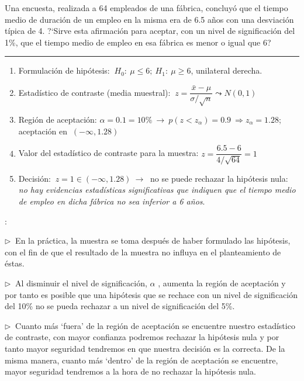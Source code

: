\vspace{4mm}
\begin{ejemplo}
\begin{ejre}

Una encuesta, realizada a 64 empleados de una fábrica, concluyó que el tiempo medio de duración de un empleo en la misma era de 6.5 años con una desviación típica de 4. ?`Sirve esta afirmación para aceptar, con un nivel de significación del 1\%, que el tiempo medio de empleo en esa fábrica es menor o igual que 6?	


	\rule{150pt}{0.1pt}
	
\begin{enumerate}[1.- ]
\item Formulación de hipótesis: $\ H_0:\ \mu\le 6;\ H_1:\ \mu\ge 6$, unilateral derecha.
\item Estadístico de contraste (media muestral): $\ z=\dfrac{\bar x - \mu}{\sigma/\sqrt{n}} \leadsto N(0,1)$
\item Región de aceptación: $\alpha=0.1=10\% \ \to \ p(z<z_\alpha)=0.9 \ \Rightarrow z_\alpha=1.28 $; aceptación en $\ (-\infty,1.28)$
\item Valor del estadístico de contraste para la muestra: $z=\dfrac{6.5-6}{4/\sqrt{64}}=1$
\item Decisión: $\ z=1 \in (-\infty,1.28) \ \to \ $ no se puede rechazar la hipótesis nula: \emph{no hay evidencias estadísticas significativas que indiquen que el tiempo medio de empleo en dicha fábrica no sea inferior a 6 años}.	 
\end{enumerate}
\end{ejre}	
\end{ejemplo}

\vspace{4mm}
\begin{destacado}
:


\vspace{2mm} $\triangleright\ $ En la práctica, la muestra se toma después de haber formulado las hipótesis, con el fin de que el resultado de la muestra no influya en el planteamiento de éstas.

\vspace{2mm} $\triangleright\ $ Al disminuir el nivel de significación, $\alpha$ , aumenta la región de aceptación y por tanto es posible que una hipótesis que se rechace con un nivel de significación del 10\% no se pueda rechazar a un nivel de significación del 5\%.

\vspace{2mm} $\triangleright\ $ Cuanto más `fuera' de la región de aceptación se encuentre nuestro estadístico de contraste, con mayor confianza podremos rechazar la hipótesis nula y por tanto mayor seguridad tendremos en que nuestra decisión es la correcta. De la misma manera, cuanto más `dentro' de la región de aceptación se encuentre, mayor seguridad tendremos a la hora de no rechazar la hipótesis nula.

\end{destacado}


